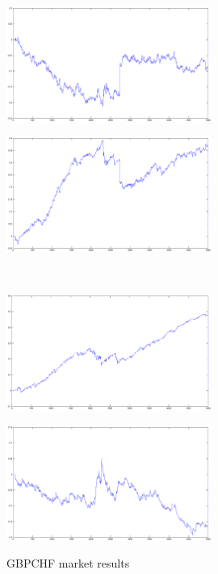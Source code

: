 \documentclass{tewiart}
\begin{document}
\begin{figure}[h]
\centering
\begin{minipage}{\linewidth}
\centering
\includegraphics[width=0.6\textwidth]{images/gbpchfA.eps}
\label{jedno}
\end{minipage}
\begin{minipage}{\linewidth}
\centering
\includegraphics[width=0.6\textwidth]{images/gbpchfB.eps}
\label{dwu}
\end{minipage}
\\
\begin{minipage}{\linewidth}
\centering
\includegraphics[width=0.6\textwidth]{images/gbpchfC.eps}
\label{cztero}
\end{minipage}
\begin{minipage}{\linewidth}
\centering
\includegraphics[width=0.6\textwidth]{images/gbpchfD.eps}
\label{mansard}
\end{minipage}
\caption{GBPCHF market results}
\end{figure}
\end{document}
